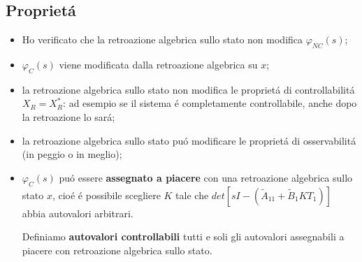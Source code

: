 \documentclass[../main.tex]{subfiles}
\begin{document}
	\subsection{Propriet\'a}
		\begin{itemize}
			\item
				Ho verificato che la retroazione algebrica sullo stato non modifica $ \varphi_{NC}(s) $;
			\item
				$ \varphi_C(s) $ viene modificata dalla retroazione algebrica su $ x $;
			\item 
				la retroazione algebrica sullo stato non modifica le propriet\'a di controllabilit\'a $ X_R = X_R^{*} $: ad esempio se il sistema \'e completamente controllabile, anche dopo la retroazione lo sar\'a;
			\item 
				la retroazione algebrica sullo stato pu\'o modificare le propriet\'a di osservabilit\'a (in peggio o in meglio);
			\item
				$ \varphi_C(s) $ pu\'o essere \textbf{assegnato a piacere} con una retroazione algebrica sullo stato $ x $, cio\'e \'e possibile scegliere $ K $ tale che $ det\left[ sI - (\tilde A_{11} + \tilde B_1 K T_1) \right] $ abbia autovalori arbitrari.
				
				\begin{definition}
					Definiamo \textbf{autovalori controllabili} tutti e soli gli autovalori assegnabili a piacere con retroazione algebrica sullo stato.
				\end{definition}
		\end{itemize}
	
\end{document}
